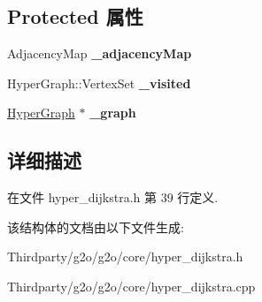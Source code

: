 \subsection*{Protected 属性}
\begin{DoxyCompactItemize}
\item 
\hypertarget{structg2o_1_1HyperDijkstra_ae306dd26e901b88fe6c54f02a45c3e7f}{Adjacency\-Map {\bfseries \-\_\-adjacency\-Map}}\label{structg2o_1_1HyperDijkstra_ae306dd26e901b88fe6c54f02a45c3e7f}

\item 
\hypertarget{structg2o_1_1HyperDijkstra_ad43cae6d9e1df2cf7db839f504ba6cc5}{Hyper\-Graph\-::\-Vertex\-Set {\bfseries \-\_\-visited}}\label{structg2o_1_1HyperDijkstra_ad43cae6d9e1df2cf7db839f504ba6cc5}

\item 
\hypertarget{structg2o_1_1HyperDijkstra_a1bf21d65ddd6e0feeb6a76f58d7f2c6e}{\hyperlink{classg2o_1_1HyperGraph}{Hyper\-Graph} $\ast$ {\bfseries \-\_\-graph}}\label{structg2o_1_1HyperDijkstra_a1bf21d65ddd6e0feeb6a76f58d7f2c6e}

\end{DoxyCompactItemize}


\subsection{详细描述}


在文件 hyper\-\_\-dijkstra.\-h 第 39 行定义.



该结构体的文档由以下文件生成\-:\begin{DoxyCompactItemize}
\item 
Thirdparty/g2o/g2o/core/hyper\-\_\-dijkstra.\-h\item 
Thirdparty/g2o/g2o/core/hyper\-\_\-dijkstra.\-cpp\end{DoxyCompactItemize}
